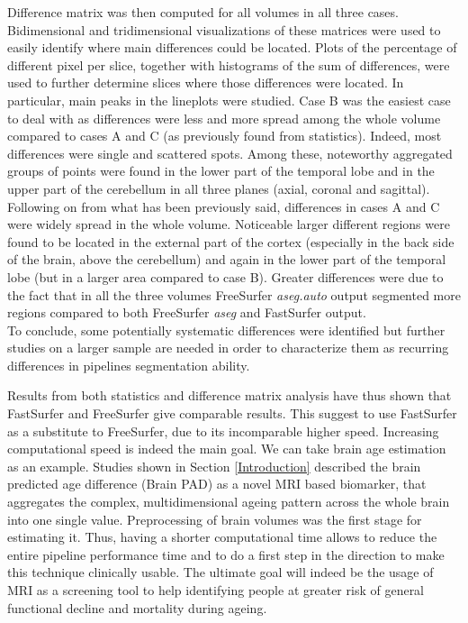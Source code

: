 \documentclass{article}
\begin{document}
	Difference matrix was then computed for all volumes in all three cases. Bidimensional and tridimensional visualizations of these matrices were used to easily identify where main differences could be located. 
	Plots of the percentage of different pixel per slice, together with histograms of the sum of differences, were used to further determine slices where those differences were located. In particular, main peaks in the lineplots were studied. Case B was the easiest case to deal with as differences were less and more spread among the whole volume compared to cases A and C (as previously found from statistics). Indeed, most differences were single and scattered spots. Among these, noteworthy aggregated groups of points were found in the lower part of the temporal lobe and in the upper part of the cerebellum in all three planes (axial, coronal and sagittal). Following on from what has been previously said, differences in cases A and C were widely spread in the whole volume. Noticeable larger different regions were found to be located in the external part of the cortex (especially in the back side of the brain, above the cerebellum) and again in the lower part of the temporal lobe (but in a larger area compared to case B). Greater differences were due to the fact that in all the three volumes FreeSurfer \textsl{aseg.auto} output segmented more regions compared to both FreeSurfer \textsl{aseg} and FastSurfer output. 
	\\
	To conclude, some potentially systematic differences were identified but further studies on a larger sample are needed in order to characterize them as recurring differences in pipelines segmentation ability. 
	

	Results from both statistics and difference matrix analysis have thus shown that FastSurfer and FreeSurfer give comparable results. This suggest to use FastSurfer as a substitute to FreeSurfer, due to its incomparable higher speed. Increasing computational speed is indeed the main goal. We can take brain age estimation as an example. Studies shown in Section \ref{Introduction} described the brain predicted age difference (Brain PAD) as a novel MRI based biomarker, that aggregates the complex, multidimensional ageing pattern across the whole brain into one single value. Preprocessing of brain volumes was the first stage for estimating it. Thus, having a shorter computational time allows to reduce the entire pipeline performance time and to do a first step in the direction to make this technique clinically usable.
	The ultimate goal will indeed be the usage of MRI as a screening tool to help identifying people at greater risk of general functional decline and mortality during ageing. 
	
	




	
	
	
	
	
	
	\newpage
	
	
	
	

	
	
	
	
	
	
	
\end{document}
